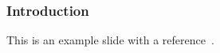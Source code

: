 \begin{frame}
	\frametitle{Introduction}
	This is an example slide with a reference~\cite{HeZeZuKrKo-FGMLN2020-Prediction-of-Mobile-Network-Connectivity}.
\end{frame}
